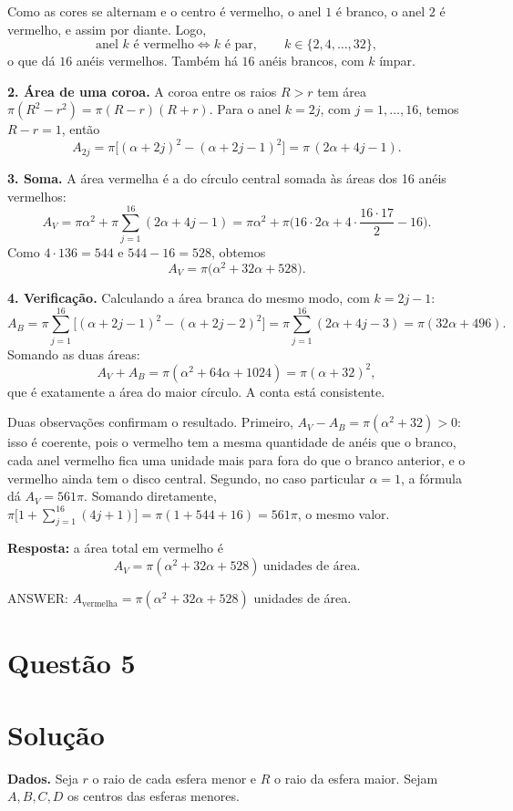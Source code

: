\documentclass{article}%
\begin{document}
Como as cores se alternam e o centro é vermelho, o anel $1$ é branco, o anel $2$ é vermelho, e assim por diante. Logo,
\[
\text{anel } k \text{ é vermelho} \iff k \text{ é par}, \qquad k\in\{2,4,\dots,32\},
\]
o que dá $16$ anéis vermelhos. Também há $16$ anéis brancos, com $k$ ímpar.

\textbf{2. Área de uma coroa.} A coroa entre os raios $R>r$ tem área $\pi(R^2-r^2)=\pi(R-r)(R+r)$. Para o anel $k=2j$, com $j=1,\dots,16$, temos $R-r=1$, então
\[
A_{2j}=\pi\big[(\alpha+2j)^2-(\alpha+2j-1)^2\big]=\pi\,(2\alpha+4j-1).
\]

\textbf{3. Soma.} A área vermelha é a do círculo central somada às áreas dos 16 anéis vermelhos:
\[
A_V=\pi\alpha^2+\pi\sum_{j=1}^{16}(2\alpha+4j-1)
=\pi\alpha^2+\pi\Big(16\cdot 2\alpha+4\cdot\frac{16\cdot 17}{2}-16\Big).
\]
Como $4\cdot 136=544$ e $544-16=528$, obtemos
\[
A_V=\pi\big(\alpha^2+32\alpha+528\big).
\]

\textbf{4. Verificação.} Calculando a área branca do mesmo modo, com $k=2j-1$:
\[
A_B=\pi\sum_{j=1}^{16}\big[(\alpha+2j-1)^2-(\alpha+2j-2)^2\big]=\pi\sum_{j=1}^{16}(2\alpha+4j-3)=\pi(32\alpha+496).
\]
Somando as duas áreas:
\[
A_V+A_B=\pi(\alpha^2+64\alpha+1024)=\pi(\alpha+32)^2,
\]
que é exatamente a área do maior círculo. A conta está consistente.

Duas observações confirmam o resultado. Primeiro, $A_V-A_B=\pi(\alpha^2+32)>0$: isso é coerente, pois o vermelho tem a mesma quantidade de anéis que o branco, cada anel vermelho fica uma unidade mais para fora do que o branco anterior, e o vermelho ainda tem o disco central. Segundo, no caso particular $\alpha=1$, a fórmula dá $A_V=561\pi$. Somando diretamente, $\pi\big[1+\sum_{j=1}^{16}(4j+1)\big]=\pi(1+544+16)=561\pi$, o mesmo valor.

\textbf{Resposta:} a área total em vermelho é
\[
A_V=\pi\left(\alpha^2+32\alpha+528\right)\ \text{unidades de área}.
\]

ANSWER: $A_{\text{vermelha}}=\pi\left(\alpha^{2}+32\alpha+528\right)$ unidades de área.%
\newpage%
\section*{Questão 5}

\section*{Solução}

\textbf{Dados.} Seja $r$ o raio de cada esfera menor e $R$ o raio da esfera maior. Sejam $A,B,C,D$ os centros das esferas menores.
\end{document}
